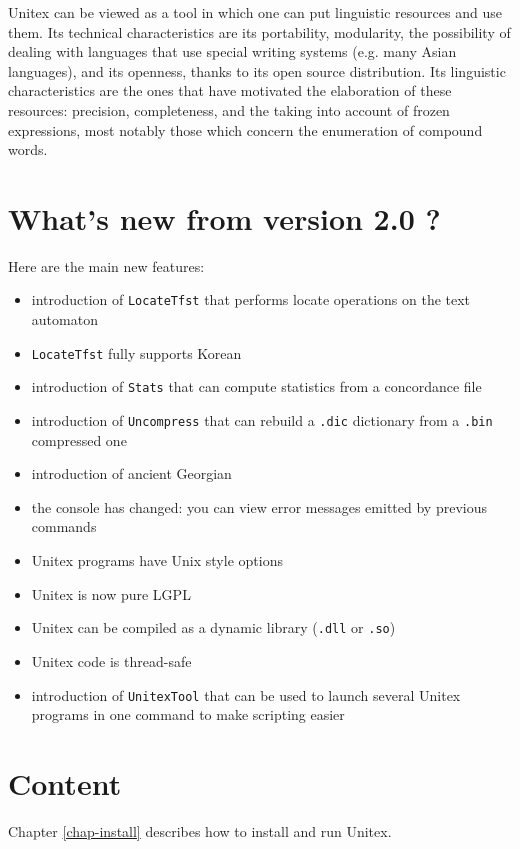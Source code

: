 \bigskip
\noindent Unitex can be viewed as a tool in which one can put linguistic resources
and use them. Its technical characteristics are its portability,  modularity,
the possibility of dealing with languages that use special writing systems (e.g. many
Asian languages), and its openness, thanks to its open source distribution. Its
linguistic characteristics are the ones that have motivated the elaboration of
these resources: precision, completeness, and the taking into account of frozen
expressions, most notably those which concern the enumeration of compound words.


\section*{What's new from version 2.0 ?}
Here are the main new features:
\begin{itemize}
  \item introduction of \verb$LocateTfst$ that performs locate operations
        on the text automaton
  \item \verb$LocateTfst$ fully supports Korean
  \item introduction of \verb$Stats$ that can compute statistics from a
        concordance file
  \item introduction of \verb$Uncompress$ that can rebuild a \verb$.dic$
        dictionary from a \verb$.bin$ compressed one
  \item introduction of ancient Georgian
  \item the console has changed: you can view error messages emitted by
        previous commands
  \item Unitex programs have Unix style options
  \item Unitex is now pure LGPL
  \item Unitex can be compiled as a dynamic library (\verb$.dll$ or \verb$.so$)
  \item Unitex code is thread-safe
  \item introduction of \verb$UnitexTool$ that can be used to launch several
  Unitex programs in one command to make scripting easier
\end{itemize}


\section*{Content}
\noindent Chapter \ref{chap-install} describes how to install and run
Unitex.

